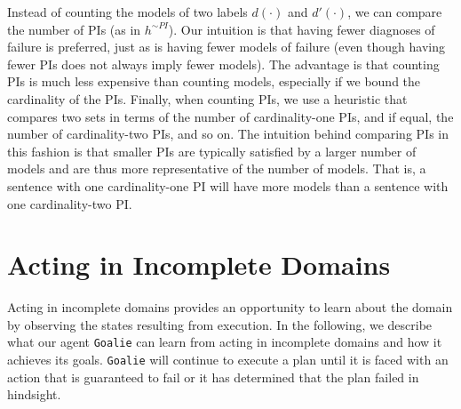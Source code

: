 \documentclass[letterpaper]{article}
\def\goalie{{\tt Goalie}}
\begin{document}
Instead of counting the models of two labels $d(\cdot)$ and $d'(\cdot)$, we can
compare the number of PIs (as in $h^{\sim PI}$).  Our intuition is that having
fewer diagnoses of failure is preferred, just as is having fewer models of failure (even though
having fewer PIs does not always imply fewer models).  The advantage is that
counting PIs is much less expensive than counting models, especially if we bound
the cardinality of the PIs.  Finally, when counting PIs, we use a heuristic
that compares two sets in terms of the number of cardinality-one PIs, and
if equal, the number of cardinality-two PIs, and so on.  The intuition behind
comparing PIs in this fashion is that smaller PIs are typically satisfied by a
larger number of models and are thus more representative of the number of
models. That is, a sentence with one cardinality-one PI will have more models than a sentence with one
cardinality-two PI.

\section{Acting in Incomplete Domains} Acting in incomplete domains provides an
opportunity to learn about the domain by observing the states resulting from
execution.  In the following, we describe what our agent \goalie{} can
learn from acting in incomplete domains and how it  achieves its goals.
\goalie{} will continue to execute a plan until it is faced with an action that
is guaranteed to fail or it has determined that the plan failed in hindsight.
\end{document}
